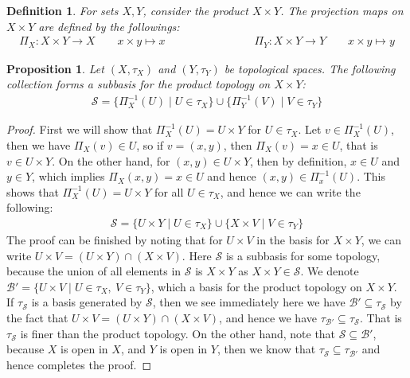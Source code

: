 \documentclass[11pt]{book}
\theoremstyle{break}
\theoremstyle{break}
\newtheorem{prop}[lem]{Proposition}
\newtheorem{defn}{Definition}[corL]
\begin{document}
\begin{defn}
For sets $X, Y$, consider the product $X\times Y$. The projection maps on $X\times Y$ are defined by the followings:
\begin{align*}
\Pi_X: X\times Y \to X \qquad x\times y \mapsto x\qquad\qquad\qquad\qquad \Pi_Y:X\times Y\to Y \qquad x\times y \mapsto y
\end{align*}
\end{defn}
\newpage
\begin{prop}
Let $(X,\tau_X)$ and $(Y,\tau_Y)$ be topological spaces. The following collection forms a subbasis for the product topology on $X\times Y$:
\begin{align}
\mathcal{S} = \{ \Pi_X^{-1}(U) \mid U \in \tau_X\}\cup \{ \Pi_Y^{-1}(V) \mid V \in \tau_Y\}
\end{align}
\end{prop}
\begin{proof}
First we will show that $\Pi_X^{-1}(U) = U \times Y$ for $U \in \tau_X$. Let $v \in \Pi_{X}^{-1}(U)$, then we have $\Pi_X(v)\in U$, so if $v = (x,y)$, then $\Pi_X(v) = x \in U$, that is $v \in U \times Y$. On the other hand, for $(x,y) \in U \times Y$, then by definition, $x \in U$ and $y \in Y$, which implies $\Pi_X(x,y) = x \in U$ and hence $(x,y) \in \Pi_{x}^{-1}(U)$. This shows that $\Pi_X^{-1}(U) = U \times Y$ for all $U \in \tau_X$, and hence we can write the following:
\begin{align}
\mathcal{S} = \{U \times Y \mid U \in \tau_X\}\cup \{ X\times V\mid V \in \tau_Y\}
\end{align}
The proof can be finished by noting that for $U \times V$ in the basis for $X\times Y$, we can write $U \times V = (U \times Y)\cap (X\times V)$. Here $\mathcal{S}$ is a subbasis for some topology, because the union of all elements in $\mathcal{S}$ is $X \times Y$ as $X\times Y \in \mathcal{S}$. We denote $\mathcal{B}' = \{ U \times V \mid U \in \tau_X, \ V\in \tau_Y \}$, which a basis for the product topology on $X \times Y$. If $\tau_{\mathcal{S}}$ is a basis generated by $\mathcal{S}$, then we see immediately here we have $\mathcal{B}'\subseteq \tau_{\mathcal{S}}$ by the fact that $U \times V = (U \times Y)\cap (X\times V)$, and hence we have $\tau_{\mathcal{B}'}\subseteq \tau_\mathcal{S}$. That is $\tau_{\mathcal{S}}$ is finer than the product topology. On the other hand, note that $\mathcal{S} \subseteq \mathcal{B}'$, because $X$ is open in $X$, and $Y$ is open in $Y$, then we know that $\tau_\mathcal{S}\subseteq \tau_{\mathcal{B}'}$ and hence completes the proof.
\end{proof}
\end{document}
